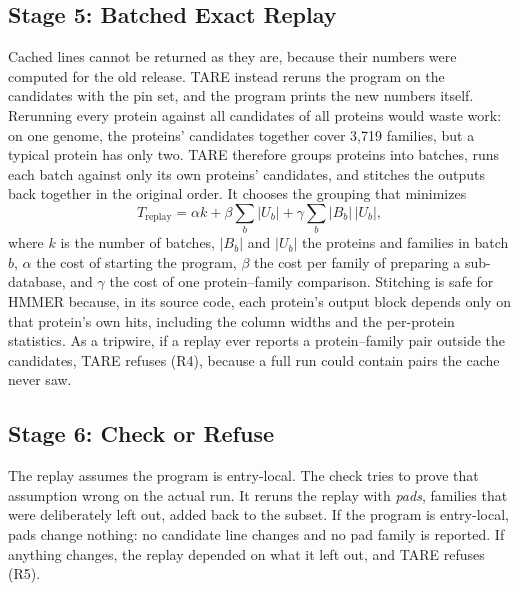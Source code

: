 \documentclass[letterpaper,twocolumn,10pt]{article}
\theoremstyle{definition}
\newcommand{\sys}{TARE\xspace}
\begin{document}
\subsection{Stage 5: Batched Exact Replay}
\label{sec:replay}

Cached lines cannot be returned as they are, because their numbers were computed for the old release. \sys instead
reruns the program on the candidates with the pin set, and the program prints the new numbers itself. Rerunning every
protein against all candidates of all proteins would waste work: on one genome, the proteins' candidates together
cover 3{,}719 families, but a typical protein has only two. \sys therefore groups proteins into batches, runs each batch
against only its own proteins' candidates, and stitches the outputs back together in the original order. It chooses
the grouping that minimizes
\begin{equation}
T_{\text{replay}} = \alpha k + \beta \sum_b |U_b| + \gamma \sum_b |B_b|\,|U_b|,
\label{eq:batch}
\end{equation}
where $k$ is the number of batches, $|B_b|$ and $|U_b|$ the proteins and families in batch $b$, $\alpha$ the cost of
starting the program, $\beta$ the cost per family of preparing a sub-database, and $\gamma$ the cost of one
protein--family comparison. Stitching is safe for HMMER because, in its source code, each protein's output block
depends only on that protein's own hits, including the column widths and the per-protein statistics. As a tripwire, if
a replay ever reports a protein--family pair outside the candidates, \sys refuses (R4), because a full run could
contain pairs the cache never saw.

\subsection{Stage 6: Check or Refuse}
\label{sec:check}

The replay assumes the program is entry-local. The check tries to prove that assumption wrong on the actual run. It
reruns the replay with \textit{pads}, families that were deliberately left out, added back to the subset. If the
program is entry-local, pads change nothing: no candidate line changes and no pad family is reported. If anything
changes, the replay depended on what it left out, and \sys refuses (R5).
\end{document}
